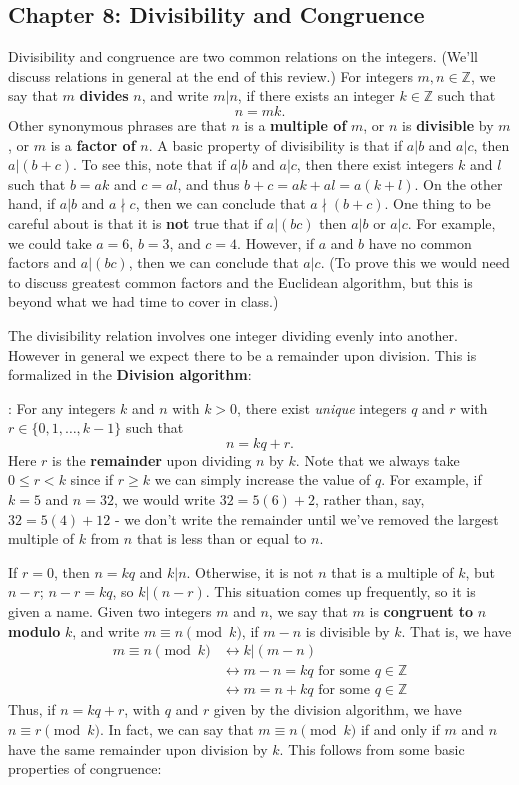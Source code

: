 \documentclass[letterpaper,12pt]{article}
\newcommand{\Z}{\mathbb{Z}}
\newcommand{\modd}[3]{#1\equiv #2 \pmod{#3}}
\begin{document}
\subsection*{Chapter 8: Divisibility and Congruence}
Divisibility and congruence are two common relations on the integers. (We'll discuss relations in general at the end of this review.) For integers $m,n\in\Z$, we say that $m$ {\bf divides} $n$, and write $m|n$, if there exists an integer $k\in\Z$ such that 
\[
 n = mk.
\]
Other synonymous phrases are that $n$ is a {\bf multiple of} $m$, or $n$ is {\bf divisible} by $m$, or $m$ is a {\bf factor of} $n$. A basic property of divisibility is that if $a|b$ and $a|c$, then $a|(b+c)$. To see this, note that if $a|b$ and $a|c$, then there exist integers $k$ and $l$ such that $b=ak$ and $c=al$, and thus $b+c = ak+al = a(k+l)$. On the other hand, if $a|b$ and $a\nmid c$, then we can conclude that $a\nmid(b+c)$. One thing to be careful about is that it is {\bf not} true that if $a|(bc)$ then $a|b$ or $a|c$. For example, we could take $a=6$, $b=3$, and $c=4$. However, if $a$ and $b$ have no common factors and $a|(bc)$, then we can conclude that $a|c$. (To prove this we would need to discuss greatest common factors and the Euclidean algorithm, but this is beyond what we had time to cover in class.)

The divisibility relation involves one integer dividing evenly into another. However in general we expect there to be a remainder upon division. This is formalized in the {\bf Division algorithm}:

: For any integers $k$ and $n$ with $k>0$, there exist {\em unique} integers $q$ and $r$ with $r\in \{0,1,\ldots, k-1\}$ such that
\[
 n = kq + r.
\]
Here $r$ is the {\bf remainder} upon dividing $n$ by $k$. Note that we always take $0\leq r<k$ since if $r\geq k$ we can simply increase the value of $q$. For example, if $k=5$ and $n=32$, we would write $32 = 5(6)+2$, rather than, say, $32 = 5(4)+12$ - we don't write the remainder until we've removed the largest multiple of $k$ from $n$ that is less than or equal to $n$.

If $r=0$, then $n=kq$ and $k|n$. Otherwise, it is not $n$ that is a multiple of $k$, but $n-r$; $n-r = kq$, so $k|(n-r)$. This situation comes up frequently, so it is given a name. Given two integers $m$ and $n$, we say that $m$ is {\bf congruent to} $n$ {\bf modulo} $k$, and write $\modd{m}{n}{k}$, if $m-n$ is divisible by $k$. That is, we have
\begin{align*}
 \modd{m}{n}{k} &\leftrightarrow k|(m-n)\\
&\leftrightarrow m-n = kq \text{ for some } q\in\Z\\
&\leftrightarrow m=n+kq \text{ for some } q\in \Z
\end{align*}
Thus, if $n=kq+r$, with $q$ and $r$ given by the division algorithm, we have $\modd{n}{r}{k}$. In fact, we can say that $\modd{m}{n}{k}$ if and only if $m$ and $n$ have the same remainder upon division by $k$. This follows from some basic properties of congruence:
\end{document}
